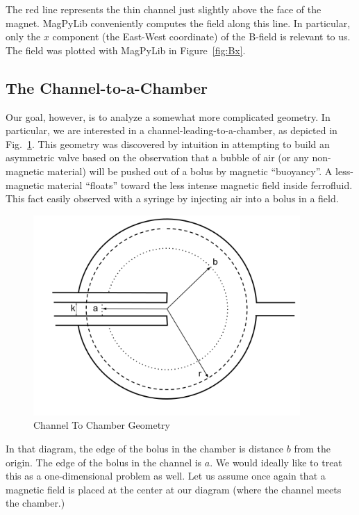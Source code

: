 \documentclass{asme2ej}
\begin{document}
The red line represents the thin channel just slightly above the face of
the magnet.
MagPyLib conveniently computes the field along this line. In particular,
only the $x$ component (the East-West coordinate) of the B-field is relevant to us.
The field was plotted with MagPyLib in Figure~\ref{fig:Bx}.



\subsection{The Channel-to-a-Chamber}

Our goal, however, is to analyze a somewhat more complicated geometry.
In particular, we are interested in a channel-leading-to-a-chamber,
as depicted in Fig.~\ref{fig:ChannelToChamber}.
This geometry was discovered by intuition in attempting to build an asymmetric valve
based on the observation that a bubble of air (or any non-magnetic material) will
be pushed out of a bolus by magnetic ``buoyancy''.
A less-magnetic material ``floats'' toward the less intense magnetic field inside
ferrofluid. This fact easily observed with a syringe by injecting air into a bolus
in a field.

\begin{figure}
\centerline{\includegraphics[width=4in]{figure/ChannelToChamber.png}}
\caption{Channel To Chamber Geometry}
\label{fig:ChannelToChamber}
\end{figure}

In that diagram, the edge of the bolus in the chamber is distance $b$ from the
origin. The edge of the bolus in the channel is $a$.
We would ideally like to treat this as a one-dimensional problem as well.
Let us assume once again that a magnetic field is placed at the center
at our diagram (where the channel meets the chamber.)
\end{document}
